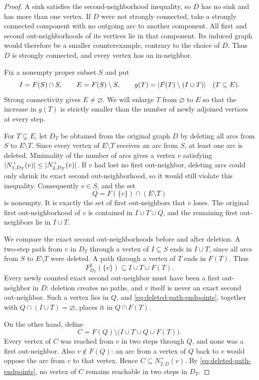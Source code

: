 \begin{proof}
A sink satisfies the second-neighborhood inequality, so $D$ has no sink
and has more than one vertex.  If $D$ were not strongly connected, take
a strongly connected component with no outgoing arc to another component.
All first and second out-neighborhoods of its vertices lie in that
component.  Its induced graph would therefore be a smaller counterexample,
contrary to the choice of $D$.  Thus $D$ is strongly connected, and every
vertex has an in-neighbor.

Fix a nonempty proper subset $S$ and put
\[
  I=F(S)\cap S,\qquad E=F(S)\setminus S,
  \qquad g(T)=\lvert F(T)\setminus(I\cup T)\rvert\quad(T\subseteq E).
\]
Strong connectivity gives $E\ne\varnothing$.  We will enlarge $T$ from
$\varnothing$ to $E$ so that the increase in $g(T)$ is strictly smaller
than the number of newly adjoined vertices at every step.

For $T\subsetneq E$, let $D_T$ be obtained from the original graph $D$
by deleting all arcs from $S$ to $E\setminus T$.  Since every vertex of
$E\setminus T$ receives an arc from $S$, at least one arc is deleted.
Minimality of the number of arcs gives a vertex $v$ satisfying
$\lvert N_{1,D_T}^+(v)\rvert\le\lvert N_{2,D_T}^+(v)\rvert$.
If $v$ had lost no first out-neighbor, deleting arcs could only shrink
its exact second out-neighborhood, so it would still violate this
inequality.  Consequently $v\in S$, and the set
\[
  Q=F(\{v\})\cap(E\setminus T)
\]
is nonempty.  It is exactly the set of first out-neighbors that $v$ loses.
The original first out-neighborhood of $v$ is contained in $I\cup T\cup Q$,
and the remaining first out-neighbors lie in $I\cup T$.

We compare the exact second out-neighborhoods before and after deletion.
A two-step path from $v$ in $D_T$ through a vertex of $I\subseteq S$
ends in $I\cup T$, since all arcs from $S$ to $E\setminus T$ were
deleted.  A path through a vertex of $T$ ends in $F(T)$.  Thus
\begin{equation}
\label{eq:deleted-path-endpoints}
  F_{D_T}^2(\{v\})\subseteq I\cup T\cup F(T).
\end{equation}
Every newly counted exact second out-neighbor must have been a first
out-neighbor in $D$: deletion creates no paths, and $v$ itself is never
an exact second out-neighbor.  Such a vertex lies in $Q$, and
\eqref{eq:deleted-path-endpoints}, together with
$Q\cap(I\cup T)=\varnothing$, places it in $Q\cap F(T)$.

On the other hand, define
\[
  C=F(Q)\setminus\bigl(I\cup T\cup Q\cup F(T)\bigr).
\]
Every vertex of $C$ was reached from $v$ in two steps through $Q$, and
none was a first out-neighbor.  Also $v\notin F(Q)$: an arc from a
vertex of $Q$ back to $v$ would oppose the arc from $v$ to that vertex.
Hence $C\subseteq N_{2,D}^+(v)$.  By
\eqref{eq:deleted-path-endpoints}, no vertex of $C$ remains reachable
in two steps in $D_T$.


\end{proof}
